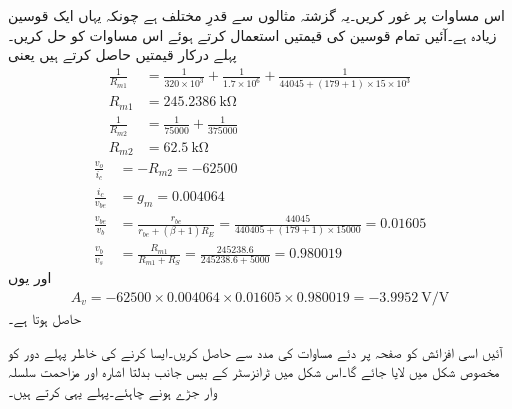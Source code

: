 اس مساوات پر غور کریں۔یہ گزشتہ مثالوں سے قدرِ مختلف ہے چونکہ یہاں ایک قوسین زیادہ ہے۔آئیں تمام قوسین کی قیمتیں استعمال کرتے ہوئے اس مساوات کو حل کریں۔پہلے درکار قیمتیں حاصل کرتے ہیں یعنی
\begin{align*}
\frac{1}{R_{m1}}&=\frac{1}{320 \times 10^{3}}+\frac{1}{1.7 \times 10^6 } +\frac{1}{44045+(179+1) \times 15 \times 10^3}\\
R_{m1}&=\SI{245.2386}{\kilo \ohm}\\
\frac{1}{R_{m2}}&=\frac{1}{75000}+\frac{1}{375000}\\
R_{m2}&=\SI{62.5}{\kilo \ohm}
\end{align*}
\begin{align*}
\frac{v_o}{i_c}&=-R_{m2}=\num{-62500}\\
\frac{i_c}{v_{be}}&=g_m=\num{0.004064}\\
\frac{v_{be}}{v_b}&=\frac{r_{be}}{r_{be}+(\beta+1)R_E}=\frac{44045}{440405+(179+1) \times 15000}=\num{0.01605}\\
\frac{v_b}{v_s}&=\frac{R_{m1}}{R_{m1}+R_S}=\frac{245238.6}{245238.6+5000}=\num{0.980019}
\end{align*}
اور یوں
\begin{align*}
A_v=-62500 \times 0.004064 \times 0.01605 \times 0.980019 =\SI[per=frac,fraction=nice]{-3.9952}{\volt \per \volt}
\end{align*}
حاصل ہوتا ہے۔

آئیں اسی افزائش کو صفحہ  پر دئے مساوات  کی مدد سے حاصل کریں۔ایسا کرنے کی خاطر پہلے دور کو مخصوص شکل میں لایا جائے گا۔اس شکل میں ٹرانزسٹر کے بیس جانب بدلتا اشارہ اور مزاحمت سلسلہ وار جڑے ہونے چاہئے۔پہلے یہی کرتے ہیں۔


